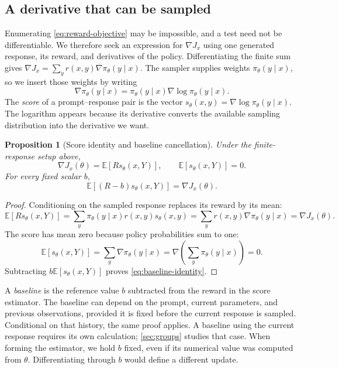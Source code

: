 \documentclass[11pt,twoside]{article}
\newcommand{\E}{\mathbb E}
\newtheorem{proposition}[theorem]{Proposition}
\theoremstyle{definition}
\theoremstyle{remark}
\begin{document}
\subsection{A derivative that can be sampled}

Enumerating \cref{eq:reward-objective} may be impossible, and a test need not
be differentiable. We therefore seek an expression for $\nabla J_x$ using
one generated response, its reward, and derivatives of the policy.
Differentiating the finite sum gives
$\nabla J_x=\sum_y r(x,y)\nabla\pi_\theta(y\mid x)$.
The sampler supplies weights $\pi_\theta(y\mid x)$, so we insert those
weights by writing
\[
 \nabla\pi_\theta(y\mid x)
 =\pi_\theta(y\mid x)\nabla\log\pi_\theta(y\mid x).
\]
The \emph{score} of a prompt--response pair is the vector
$s_\theta(x,y)=\nabla\log\pi_\theta(y\mid x)$.
The logarithm appears because its derivative converts the available
sampling distribution into the derivative we want.

\begin{proposition}[Score identity and baseline cancellation]
\label{prop:score}
Under the finite-response setup above,
\begin{equation}
 \nabla J_x(\theta)=\E[R s_\theta(x,Y)],
 \qquad \E[s_\theta(x,Y)]=0.
 \label{eq:score-identities}
\end{equation}
For every fixed scalar $b$,
\begin{equation}
 \E[(R-b)s_\theta(x,Y)]=\nabla J_x(\theta).
 \label{eq:baseline-identity}
\end{equation}
\end{proposition}
\begin{proof}
Conditioning on the sampled response replaces its reward by its mean:
\[
 \E[R s_\theta(x,Y)]
 =\sum_y\pi_\theta(y\mid x)r(x,y)s_\theta(x,y)
 =\sum_y r(x,y)\nabla\pi_\theta(y\mid x)=\nabla J_x(\theta).
\]
The score has mean zero because policy probabilities sum to one:
\[
 \E[s_\theta(x,Y)]
 =\sum_y\nabla\pi_\theta(y\mid x)
 =\nabla\!\left(\sum_y\pi_\theta(y\mid x)\right)=0.
\]
Subtracting $b\E[s_\theta(x,Y)]$ proves
\cref{eq:baseline-identity}.
\end{proof}

A \emph{baseline} is the reference value $b$ subtracted from the reward in
the score estimator.
The baseline can depend on the prompt, current parameters, and
previous observations, provided it is fixed before the current response is
sampled. Conditional on that history, the same proof applies.
A baseline using the current response requires its own calculation;
\cref{sec:groups} studies that case. When forming the estimator, we hold
$b$ fixed, even if its numerical value was computed from $\theta$.
Differentiating through $b$ would define a different update.
\end{document}
